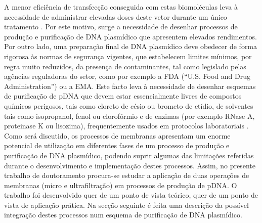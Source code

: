 A menor eficiência de transfecção conseguida com estas biomoléculas leva à necessidade de administrar elevadas doses deste vetor durante um único tratamento \cite{prather,gomes}. Por este motivo, surge a necessidade de desenhar processos de produção e purificação de DNA plasmídico que apresentem elevados rendimentos. Por outro lado, uma preparação final de DNA plasmídico deve obedecer de forma rigorosa às normas de segurança vigentes, que estabelecem limites mínimos, por regra muito reduzidos, da presença de contaminantes, tal como legislado pelas agências reguladoras do setor, como por exemplo a FDA (``U.S. Food and Drug Administration'') ou a EMA. 
Este facto leva à necessidade de desenhar esquemas de purificação de pDNA que devem estar essencialmente livres de compostos químicos perigosos, tais como cloreto de césio ou brometo de etídio, de solventes tais como isopropanol, fenol ou clorofórmio e de enzimas (por exemplo RNase A, proteinase K ou lisozima), frequentemente usados em protocolos laboratoriais \cite{prather,sousahplc,smrekar,duvaltff,sousabab,kahn,lander}. 
%
Como será discutido, os processos de membranas apresentam um enorme potencial de utilização em diferentes fases de um processo de produção e purificação de DNA plasmídico, podendo suprir algumas das limitações referidas durante o desenvolvimento e implementação destes processos. Assim, no presente trabalho de doutoramento procura-se estudar a aplicação de duas operações de membranas (micro e ultrafiltração) em processos de produção de pDNA. O trabalho foi desenvolvido quer de um ponto de vista teórico, quer de um ponto de vista de aplicação prática. Na secção seguinte é feita uma descrição da possível integração destes processos num esquema de purificação de DNA plasmídico.


